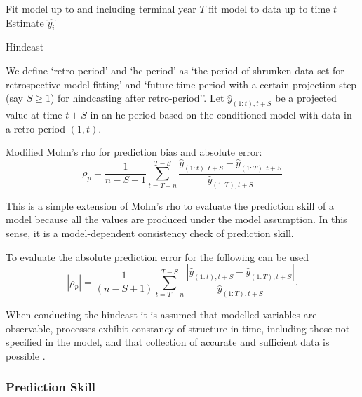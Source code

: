 \documentclass[12pt,halfline,a4paper,nonumbib]{ouparticle}
\newcommand{\disp}{\displaystyle}
\begin{document}
\begin{algorithm}[!ht]
\begin{algorithmic}[1]
\State Fit model up to and including terminal year $T$
\State fit model to data up to time $t$  
\State Estimate $\hat{y_i}$
\EndFor
\EndFor
\caption{Hindcast}
\label{Hindcast}
\end{algorithmic}
\end{algorithm}


We  define `retro-period' and `hc-period' as `the period of shrunken data set for retrospective model fitting' and `future time period with a certain projection step (say $S \geq 1$) for hindcasting after retro-period''. Let $\hat{y}_{(1:t),t+S}$ be a projected value at time $t+S$ in an hc-period based on the conditioned model with data in a retro-period $(1,t)$. 

\vspace{0.2cm} \noindent
{ Modified Mohn's rho for prediction bias and absolute error:}\\
\begin{equation}
\label{eqn:mohn2}
\rho_p = \disp \frac{1}{n-S+1} \sum_{t=T-n}^{T-S} 
\frac{\hat{y}_{(1:t),t+S}-\hat{y}_{(1:T),t+S}}{\hat{y}_{(1:T),t+S}} 
\end{equation} 

This is a simple extension of Mohn's rho to evaluate the prediction skill of a model because all the values are produced under the model assumption. In this sense, it is a model-dependent consistency check of prediction skill. 

To evaluate the absolute prediction error for the following can be used
\begin{equation}
\label{eqn:mohn3}
|\rho_p| = \disp \frac{1}{(n-S+1)} \sum_{t=T-n}^{T-S}
\frac{\left| \hat{y}_{(1:t),t+S}-\hat{y}_{(1:T),t+S} \right|}{\hat{y}_{(1:T),t+S}}. 
\end{equation} 


When conducting the hindcast it is assumed that modelled variables are observable, processes exhibit constancy of structure in time, including those not specified in the model, and that collection of accurate and sufficient data is possible \parencite{hodges1992you}.

\subsubsection{Prediction Skill}
\end{document}
